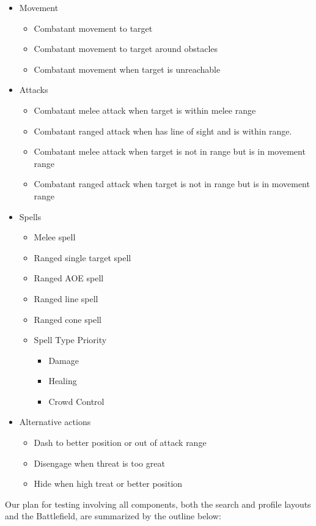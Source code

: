 \documentclass[12pt,a4paper]{report}
\begin{document}
	\begin{itemize}
		\item Movement
		\begin{itemize}
			\item Combatant movement to target
			\item Combatant movement to target around obstacles
			\item Combatant movement when target is unreachable
		\end{itemize}
		\item Attacks
		\begin{itemize}
			\item Combatant melee attack when target is within melee range
			\item Combatant ranged attack when has line of sight and is within range.
			\item Combatant melee attack when target is not in range but is in movement range
			\item Combatant ranged attack when target is not in range but is in movement range
		\end{itemize}
		\item Spells
			\begin{itemize}
				\item Melee spell
				\item Ranged single target spell
				\item Ranged AOE spell
				\item Ranged line spell
				\item Ranged cone spell
				\item Spell Type Priority
				\begin{itemize}
					\item Damage
					\item Healing
					\item Crowd Control
				\end{itemize}
			\end{itemize}
		\item Alternative actions
		\begin{itemize}
			\item Dash to better position or out of attack range
			\item Disengage when threat is too great
			\item Hide when high treat or better position
		\end{itemize}
	\end{itemize}

Our plan for testing involving all components, both the search and profile layouts and the Battlefield, are summarized by the outline below:
\end{document}
